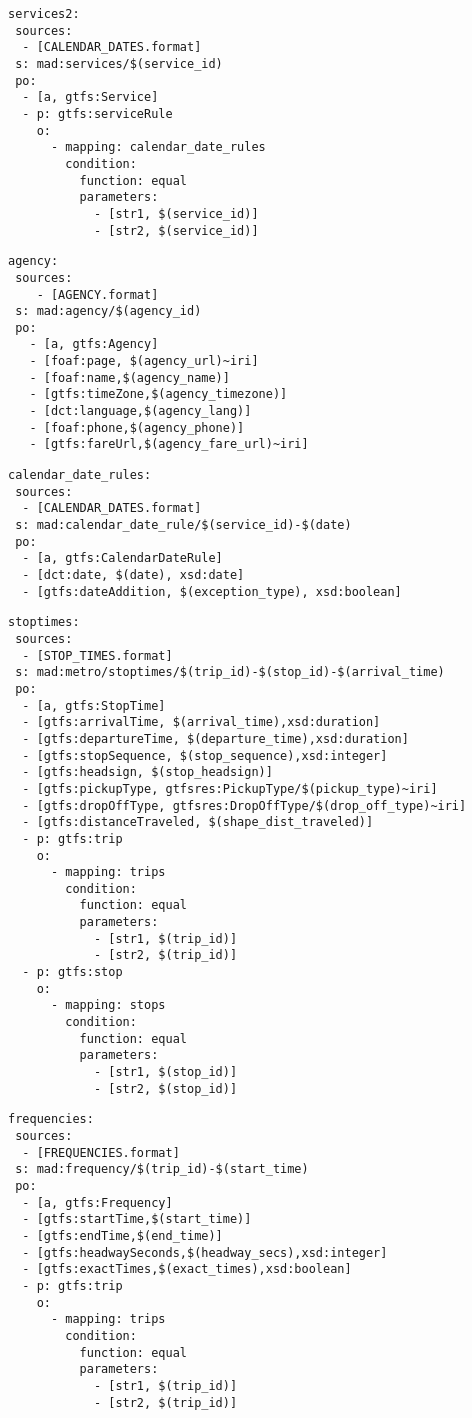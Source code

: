 \begin{lstlisting}[caption=Service\_Calendar\_Date TripleMap, label=lst:service2, basicstyle=\small,frame=single]
services2:
 sources:
  - [CALENDAR_DATES.format]
 s: mad:services/$(service_id)
 po:
  - [a, gtfs:Service]
  - p: gtfs:serviceRule
    o:
      - mapping: calendar_date_rules
        condition:
          function: equal
          parameters:
            - [str1, $(service_id)]
            - [str2, $(service_id)]
\end{lstlisting}
\begin{lstlisting}[caption=Agency TripleMap, label=lst:agency, basicstyle=\small,frame=single]
agency:
 sources:
    - [AGENCY.format]
 s: mad:agency/$(agency_id)
 po:
   - [a, gtfs:Agency]
   - [foaf:page, $(agency_url)~iri]
   - [foaf:name,$(agency_name)]
   - [gtfs:timeZone,$(agency_timezone)]
   - [dct:language,$(agency_lang)]
   - [foaf:phone,$(agency_phone)]
   - [gtfs:fareUrl,$(agency_fare_url)~iri]
\end{lstlisting}
\begin{lstlisting}[caption=Calendar\_Date\_Rules TripleMap, label=lst:calendarDateRules, basicstyle=\small,frame=single]
calendar_date_rules:
 sources:
  - [CALENDAR_DATES.format]
 s: mad:calendar_date_rule/$(service_id)-$(date)
 po:
  - [a, gtfs:CalendarDateRule]
  - [dct:date, $(date), xsd:date]
  - [gtfs:dateAddition, $(exception_type), xsd:boolean]
\end{lstlisting}
\begin{lstlisting}[caption=Stop\_Times TripleMap, label=lst:stoptimes, basicstyle=\small,frame=single]
stoptimes:
 sources:
  - [STOP_TIMES.format]
 s: mad:metro/stoptimes/$(trip_id)-$(stop_id)-$(arrival_time)
 po:
  - [a, gtfs:StopTime]
  - [gtfs:arrivalTime, $(arrival_time),xsd:duration]
  - [gtfs:departureTime, $(departure_time),xsd:duration]
  - [gtfs:stopSequence, $(stop_sequence),xsd:integer]
  - [gtfs:headsign, $(stop_headsign)]
  - [gtfs:pickupType, gtfsres:PickupType/$(pickup_type)~iri]
  - [gtfs:dropOffType, gtfsres:DropOffType/$(drop_off_type)~iri]
  - [gtfs:distanceTraveled, $(shape_dist_traveled)]
  - p: gtfs:trip
    o:
      - mapping: trips
        condition:
          function: equal
          parameters:
            - [str1, $(trip_id)]
            - [str2, $(trip_id)]
  - p: gtfs:stop
    o:
      - mapping: stops
        condition:
          function: equal
          parameters:
            - [str1, $(stop_id)]
            - [str2, $(stop_id)]
\end{lstlisting}
\begin{lstlisting}[caption=Frequencies TripleMap, label=lst:frequencies, basicstyle=\small,frame=single]
frequencies:
 sources:
  - [FREQUENCIES.format]
 s: mad:frequency/$(trip_id)-$(start_time)
 po:
  - [a, gtfs:Frequency]
  - [gtfs:startTime,$(start_time)]
  - [gtfs:endTime,$(end_time)]
  - [gtfs:headwaySeconds,$(headway_secs),xsd:integer]
  - [gtfs:exactTimes,$(exact_times),xsd:boolean]
  - p: gtfs:trip
    o:
      - mapping: trips
        condition:
          function: equal
          parameters:
            - [str1, $(trip_id)]
            - [str2, $(trip_id)]
\end{lstlisting}
